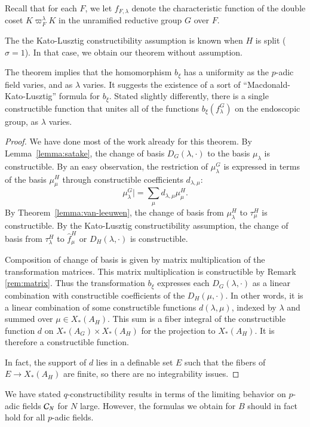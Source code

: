 Recall that for each $F$, we let  $f_{F,\lambda}$ denote the characteristic function
of the double coset $K\varpi_F^\lambda K$ in the unramified reductive group $G$ over $F$.

The the Kato-Lusztig constructibility assumption is known when $H$ is split ($\sigma=1$).
In that case, we obtain our theorem without assumption.

The theorem implies that the homomorphism $b_\xi$ has a uniformity as the $p$-adic field
varies, and as $\lambda$ varies.  It suggests the existence of a sort of ``Macdonald-Kato-Lusztig''
formula for $b_\xi$.
Stated slightly differently, there is a single constructible function that unites
all of the functions $b_\xi (f^G_\lambda)$ on the endoscopic group, as $\lambda$ varies.

\begin{proof}
We have done most of the work already for this theorem.
By Lemma~\ref{lemma:satake}, the change of basis $D_G(\lambda,\cdot)$ to the basis $\mu_\lambda$
is constructible.  By an easy observation, the restriction of $\mu^G_\lambda$ is expressed in terms of the basis $\mu^H_\mu$ through
constructible coefficients $d_{\lambda,\mu}$:
\[
\mu^G_\lambda| = \sum_{\mu} d_{\lambda,\mu} \mu^H_\mu.
\]
By Theorem~\ref{lemma:van-leeuwen}, the change of basis from $\mu^H_\lambda$ to $\tau^H_\mu$ is constructible.
By the Kato-Lusztig constructibility assumption, the change of basis from 
$\tau^H_\lambda$ to $\hat f^H_\mu$ or $D_H(\lambda,\cdot)$ is constructible.  

Composition of change of basis is given by matrix multiplication of the transformation matrices.
This matrix multiplication is constructible by Remark \ref{rem:matrix}.  Thus the transformation $b_\xi$
expresses each $D_G(\lambda,\cdot)$ as a linear combination with constructible coefficients
of the $D_H(\mu,\cdot)$.   In other words, it is a linear combination of some constructible functions
$d(\lambda,\mu)$, indexed by $\lambda$ and summed over $\mu\in X_*(A_H)$.  This sum
is a fiber integral of the constructible function $d$ on $X_*(A_G)\times X_*(A_H)$ for the
projection to $X_*(A_H)$.  It is therefore a constructible function.

In fact, the support of $d$ lies in a definable set $E$ such that the fibers of $E\to X_*(A_H)$
are finite, so there are no integrability issues.
\end{proof}

\begin{remark}  We have stated $q$-constructibility results in terms of the limiting behavior on
$p$-adic fields $\mathcal C_N$ for $N$ large.  However, the formulas we obtain for $B$ should in fact hold for all
$p$-adic fields.
\end{remark}

